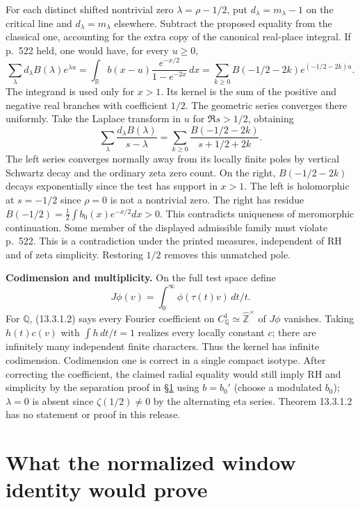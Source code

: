 \documentclass[11pt,reqno]{amsart}
\numberwithin{equation}{section}
\newcommand{\Q}{\mathbb Q}\newcommand{\R}{\mathbb R}\newcommand{\C}{\mathbb C}\newcommand{\Z}{\mathbb Z}
\begin{document}
For each distinct shifted nontrivial zero \(\lambda=\rho-1/2\), put \(d_\lambda=m_\lambda-1\) on the critical line and \(d_\lambda=m_\lambda\) elsewhere. Subtract the proposed equality from the classical one, accounting for the extra copy of the canonical real-place integral. If p.~522 held, one would have, for every \(u\ge0\),
\[
 \sum_\lambda d_\lambda B(\lambda)e^{\lambda u}
   = \int_\R b(x-u)\frac{e^{-x/2}}{1-e^{-2x}}\,dx
   =\sum_{k\ge0} B(-1/2-2k)e^{(-1/2-2k)u}.
\]
The integrand is used only for \(x>1\). Its kernel is the sum of the positive and negative real branches with coefficient \(1/2\). The geometric series converges there uniformly. Take the Laplace transform in \(u\) for \(\Re s>1/2\), obtaining
\[
  \sum_\lambda\frac{d_\lambda B(\lambda)}{s-\lambda}
    =\sum_{k\ge0}\frac{B(-1/2-2k)}{s+1/2+2k}.
\]
The left series converges normally away from its locally finite poles by vertical Schwartz decay and the ordinary zeta zero count. On the right, \(B(-1/2-2k)\) decays exponentially since the test has support in \(x>1\). The left is holomorphic at \(s=-1/2\) since \(\rho=0\) is not a nontrivial zero. The right has residue \(B(-1/2)=\frac12\int b_0(x)e^{-x/2}dx>0\). This contradicts uniqueness of meromorphic continuation. Some member of the displayed admissible family must violate p.~522. This is a contradiction under the printed measures, independent of RH and of zeta simplicity. Restoring \(1/2\) removes this unmatched pole.

\textbf{Codimension and multiplicity.} On the full test space define \[J\phi(v)=\int_0^\infty\phi(\tau(t)v)\,dt/t.\] For \(\Q\), (13.3.1.2) says every Fourier coefficient on \(C_\Q^1\simeq\widehat{\Z}^\times\) of \(J\phi\) vanishes. Taking \(h(t)c(v)\) with \(\int h\,dt/t=1\) realizes every locally constant \(c\); there are infinitely many independent finite characters. Thus the kernel has infinite codimension. Codimension one is correct in a single compact isotype. After correcting the coefficient, the claimed radial equality would still imply RH and simplicity by the separation proof in \S\ref{sec:12} using \(b=b_0'\) (choose a modulated \(b_0\)); \(\lambda=0\) is absent since \(\zeta(1/2)\ne0\) by the alternating eta series. Theorem 13.3.1.2 has no statement or proof in this release.


\section{What the normalized window identity would prove}\label{sec:12}
\end{document}
